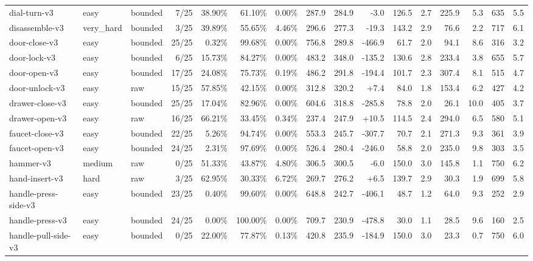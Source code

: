 \begin{landscape}
\begin{longtable}{@{}l l l r r r r r r r r r r r r r@{}}
dial-turn-v3 & easy & bounded & 7/25 & 38.90\% & 61.10\% & 0.00\% & 287.9 & 284.9 & -3.0 & 126.5 & 2.7 & 225.9 & 5.3 & 635 & 5.5 \\
disassemble-v3 & very\_hard & bounded & 3/25 & 39.89\% & 55.65\% & 4.46\% & 296.6 & 277.3 & -19.3 & 143.2 & 2.9 & 76.6 & 2.2 & 717 & 6.1 \\
door-close-v3 & easy & bounded & 25/25 & 0.32\% & 99.68\% & 0.00\% & 756.8 & 289.8 & -466.9 & 61.7 & 2.0 & 94.1 & 8.6 & 316 & 3.2 \\
door-lock-v3 & easy & bounded & 6/25 & 15.73\% & 84.27\% & 0.00\% & 483.2 & 348.0 & -135.2 & 130.6 & 2.8 & 233.4 & 3.8 & 655 & 5.7 \\
door-open-v3 & easy & bounded & 17/25 & 24.08\% & 75.73\% & 0.19\% & 486.2 & 291.8 & -194.4 & 101.7 & 2.3 & 307.4 & 8.1 & 515 & 4.7 \\
door-unlock-v3 & easy & raw & 15/25 & 57.85\% & 42.15\% & 0.00\% & 312.8 & 320.2 & +7.4 & 84.0 & 1.8 & 153.4 & 6.2 & 427 & 4.2 \\
drawer-close-v3 & easy & bounded & 25/25 & 17.04\% & 82.96\% & 0.00\% & 604.6 & 318.8 & -285.8 & 78.8 & 2.0 & 26.1 & 10.0 & 405 & 3.7 \\
drawer-open-v3 & easy & raw & 16/25 & 66.21\% & 33.45\% & 0.34\% & 237.4 & 247.9 & +10.5 & 114.5 & 2.4 & 294.0 & 6.5 & 580 & 5.1 \\
faucet-close-v3 & easy & bounded & 22/25 & 5.26\% & 94.74\% & 0.00\% & 553.3 & 245.7 & -307.7 & 70.7 & 2.1 & 271.3 & 9.3 & 361 & 3.9 \\
faucet-open-v3 & easy & bounded & 24/25 & 2.31\% & 97.69\% & 0.00\% & 526.4 & 280.4 & -246.0 & 58.8 & 2.0 & 235.0 & 9.8 & 303 & 3.5 \\
hammer-v3 & medium & raw & 0/25 & 51.33\% & 43.87\% & 4.80\% & 306.5 & 300.5 & -6.0 & 150.0 & 3.0 & 145.8 & 1.1 & 750 & 6.2 \\
hand-insert-v3 & hard & raw & 3/25 & 62.95\% & 30.33\% & 6.72\% & 269.7 & 276.2 & +6.5 & 139.7 & 2.9 & 30.3 & 1.9 & 699 & 5.8 \\
handle-press-side-v3 & easy & bounded & 23/25 & 0.40\% & 99.60\% & 0.00\% & 648.8 & 242.7 & -406.1 & 48.7 & 1.2 & 64.0 & 9.3 & 252 & 2.9 \\
handle-press-v3 & easy & bounded & 24/25 & 0.00\% & 100.00\% & 0.00\% & 709.7 & 230.9 & -478.8 & 30.0 & 1.1 & 28.5 & 9.6 & 160 & 2.5 \\
handle-pull-side-v3 & easy & bounded & 0/25 & 22.00\% & 77.87\% & 0.13\% & 420.8 & 235.9 & -184.9 & 150.0 & 3.0 & 23.3 & 0.7 & 750 & 6.0 \\

\end{longtable}
\end{landscape}
